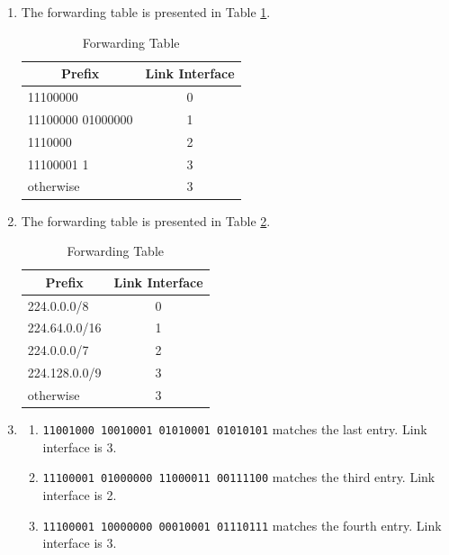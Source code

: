 \begin{exercise}[]
\begin{solution}
\begin{enumerate}
    \item The forwarding table is presented in Table \ref{tab:ex1-1}.
    \begin{table}[h]
      \centering
      \begin{tabular}{lc}
      \hline
      \multicolumn{1}{c}{\textbf{Prefix}} & \textbf{Link Interface} \\ \hline
      11100000                            & 0                       \\
      11100000 01000000                   & 1                       \\
      1110000                             & 2                       \\
      11100001 1                          & 3                       \\
      otherwise                           & 3                       \\ \hline
      \end{tabular}
      \caption{Forwarding Table \label{tab:ex1-1}}
    \end{table}
    \item The forwarding table is presented in Table \ref{tab:ex1-2}.
    \begin{table}[h]
      \centering
      \begin{tabular}{lc}
      \hline
      \multicolumn{1}{c}{\textbf{Prefix}} & \textbf{Link Interface} \\ \hline
      224.0.0.0/8                            & 0                       \\
      224.64.0.0/16                  & 1                       \\
      224.0.0.0/7                     & 2                       \\
      224.128.0.0/9                          & 3                       \\
      otherwise                           & 3                       \\ \hline
      \end{tabular}
      \caption{Forwarding Table \label{tab:ex1-2}}
    \end{table}
    \item \begin{enumerate}
      \item \texttt{11001000 10010001 01010001 01010101} matches the last entry. Link interface is 3.
      \item \texttt{11100001 01000000 11000011 00111100} matches the third entry. Link interface is 2.
      \item \texttt{11100001 10000000 00010001 01110111} matches the  fourth entry. Link interface is 3.
    \end{enumerate}
  \end{enumerate}
  \end{solution}
  \label{ex1}
\end{exercise}




